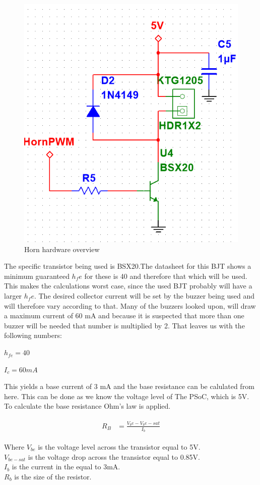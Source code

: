 \begin{figure}[H]
	\centering
	\includegraphics[width=0.7\linewidth]{Hardware/Pictures/Horn_hw}
	\caption{Horn hardware overview}
	\label{fig:Horn control}
\end{figure}

The specific transistor being used is BSX20.The datasheet  for this BJT shows a minimum guaranteed $h_fe$ for these is 40 and therefore that which will be used. This makes the calculations worst case, since the used BJT probably will have a larger $h_fe$. The desired collector current will be set by the buzzer being used and will therefore vary according to that. Many of the buzzers looked upon, will draw a maximum current of 60 mA and because it is suspected that more than one buzzer will be needed that number is multiplied by 2. That leaves us with the following numbers:

$h_{fe} = 40 $ 

$I_c = 60 mA$

This yields a base current of 3 mA and the base resistance can be calulated from here. This can be done as we know the voltage level of The PSoC, which is 5V. \\
To calculate the base resistance Ohm's law is applied. 

\begin{align}
	\begin{split}
		R_B &= \frac{V_be - V_be-sat}{I_b}
	\end{split}
\end{align}

Where $V_{be}$ is the voltage level across the transistor equal to 5V. \\ 
$V_{be-sat}$ is the voltage drop across the transistor equal to 0.85V. \\ 
$I_b$ is the current in the equal to 3mA.  \\
$R_b$ is the size of the resistor. \\ 


